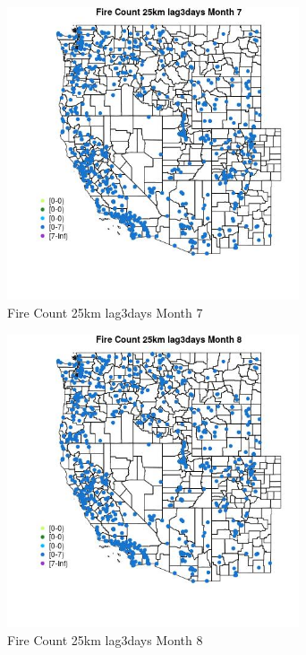 \begin{figure} 
\centering  
\includegraphics[width=0.77\textwidth]{Code_Outputs/Report_ML_input_PM25_Step4_part_e_de_duplicated_aves_compiled_2019-05-21wNAs_MapObsMo7Fire_Count_25km_lag3days.jpg} 
\caption{\label{fig:Report_ML_input_PM25_Step4_part_e_de_duplicated_aves_compiled_2019-05-21wNAsMapObsMo7Fire_Count_25km_lag3days}Fire Count 25km lag3days Month 7} 
\end{figure} 
 

\begin{figure} 
\centering  
\includegraphics[width=0.77\textwidth]{Code_Outputs/Report_ML_input_PM25_Step4_part_e_de_duplicated_aves_compiled_2019-05-21wNAs_MapObsMo8Fire_Count_25km_lag3days.jpg} 
\caption{\label{fig:Report_ML_input_PM25_Step4_part_e_de_duplicated_aves_compiled_2019-05-21wNAsMapObsMo8Fire_Count_25km_lag3days}Fire Count 25km lag3days Month 8} 
\end{figure} 
 

